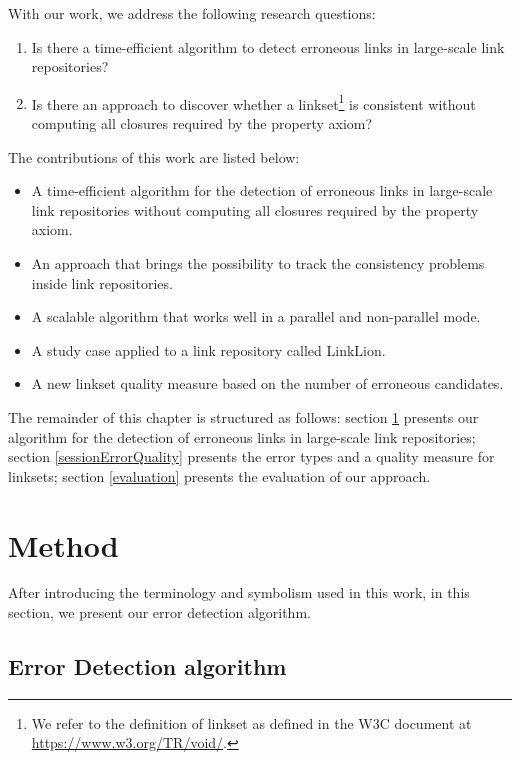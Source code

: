 With our work, we address the following research questions:
\begin{enumerate}
	\item Is there a time-efficient algorithm to detect erroneous links in large-scale link repositories?
	\item Is there an approach to discover whether a linkset\footnote{We refer to the definition of linkset as defined in the W3C document at \url{https://www.w3.org/TR/void/}.} is consistent without computing all closures required by the property axiom?
\end{enumerate}
%
The contributions of this work are listed below:
\begin{itemize}
	\item A time-efficient algorithm for the detection of erroneous links in large-scale link repositories without computing all closures required by the property axiom.
	\item An approach that brings the possibility to track the consistency problems inside link repositories.
	\item A scalable algorithm that works well in a parallel and non-parallel mode.
	\item A study case applied to a link repository called LinkLion.
	\item A new linkset quality measure based on the number of erroneous candidates.
\end{itemize} 
%
The remainder of this chapter is structured as follows: section \ref{approach} presents our algorithm for the detection of erroneous links in large-scale link repositories; section \ref{sessionErrorQuality} presents the error types and a quality measure for linksets; section \ref{evaluation} presents the evaluation of our approach.

\section{Method} \label{approach}
After introducing the terminology and symbolism used in this work, in this section, we present our error detection algorithm.

\subsection{Error Detection algorithm}

